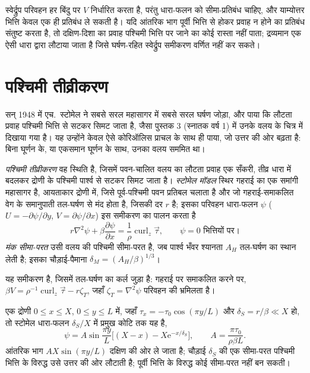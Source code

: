स्वेर्द्रुप परिवहन हर बिंदु पर $V$ निर्धारित करता है, परंतु धारा-फलन
को सीमा-प्रतिबंध चाहिए, और याम्योत्तर भित्ति केवल एक ही प्रतिबंध ले सकती है। यदि
आंतरिक भाग पूर्वी भित्ति से होकर प्रवाह न होने का प्रतिबंध संतुष्ट करता है, तो दक्षिण-दिशा का प्रवाह
पश्चिमी भित्ति पर जाने का कोई रास्ता नहीं पाता; द्रव्यमान एक ऐसी धारा द्वारा लौटाया जाता है
जिसे घर्षण-रहित स्वेर्द्रुप समीकरण वर्णित नहीं कर सकते।

\section{पश्चिमी तीव्रीकरण}\label{sec:b3:ocean-dynamics:western}

सन् 1948 में एच.~स्टोमेल ने सबसे सरल महासागर में सबसे सरल घर्षण जोड़ा, और
पाया कि लौटता प्रवाह पश्चिमी भित्ति से सटकर सिमट जाता है, जैसा
पुस्तक 3 (स्नातक वर्ष 1) में उनके वलय के चित्र में दिखाया गया है। यह उन्होंने केवल ऐसे कोरिऑलिस
प्राचल के साथ ही पाया, जो उत्तर की ओर बढ़ता है: बिना घूर्णन के, या एकसमान घूर्णन के साथ,
उनका वलय सममित था।

\begin{definition}\label{def:b3:ocean-dynamics:western-intensification}
\emph{पश्चिमी तीव्रीकरण} वह स्थिति है, जिसमें
पवन-चालित वलय का लौटता प्रवाह एक सँकरी, तीव्र धारा में बदलकर
द्रोणी के पश्चिमी पार्श्व से सटकर सिमट जाता है। \emph{स्टोमेल
मॉडल} स्थिर गहराई का एक समांगी महासागर है,
आयताकार द्रोणी में, जिसे पूर्व-पश्चिमी पवन प्रतिबल चलाता है और जो
गहराई-समाकलित वेग के समानुपाती तल-घर्षण से मंद होता है, जिसकी दर $r$ है;
इसका परिवहन धारा-फलन $\psi$ ($U = -\partial\psi/\partial y$, $V =
\partial\psi/\partial x$) इस समीकरण का पालन करता है
\[
r\nabla^2\psi + \beta\frac{\partial\psi}{\partial x} =
\frac{1}{\rho}\operatorname{curl}_z\vec\tau ,\qquad \psi = 0 \text{ भित्तियों पर।}
\]
\emph{मंक सीमा-परत} उसी वलय की पश्चिमी
सीमा-परत है, जब पार्श्व भँवर श्यानता $A_H$
तल-घर्षण का स्थान लेती है; इसका चौड़ाई-पैमाना $\delta_M =
(A_H/\beta)^{1/3}$।
\end{definition}

यह समीकरण  है, जिसमें तल-घर्षण का कर्ल
जुड़ा है: गहराई पर समाकलित करने पर, $\beta V = \rho^{-1}\operatorname{curl}_z
\vec\tau - r\zeta_T$, जहाँ $\zeta_T = \nabla^2\psi$ परिवहन की
भ्रमिलता है।

\begin{theorem}\label{thm:b3:ocean-dynamics:stommel}
एक द्रोणी $0 \le x \le X$, $0 \le y \le L$ में, जहाँ $\tau_x = -\tau_0
\cos(\pi y/L)$ और $\delta_S = r/\beta \ll X$ हो, तो स्टोमेल धारा-फलन
$\delta_S/X$ में प्रमुख कोटि तक यह है,
\[
\psi = A\sin\frac{\pi y}{L}\Big[(X - x) - X\mathrm e^{-x/\delta_S}\Big],
\qquad A = \frac{\pi\tau_0}{\rho\beta L} .
\]
आंतरिक भाग $AX\sin(\pi y/L)$ दक्षिण की ओर ले जाता है; चौड़ाई
$\delta_S$ की एक सीमा-परत पश्चिमी भित्ति के विरुद्ध उसे उत्तर की ओर लौटाती है; पूर्वी भित्ति के विरुद्ध
कोई सीमा-परत नहीं बन सकती।
\end{theorem}

